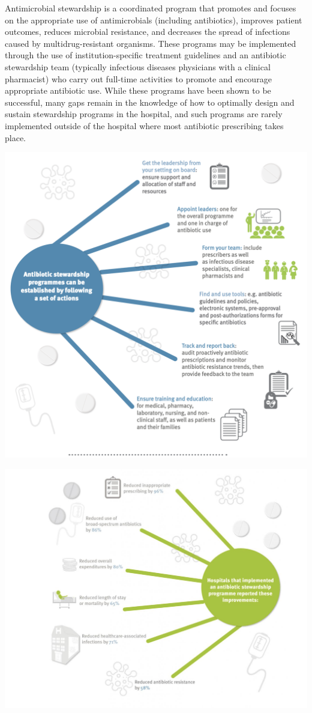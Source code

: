 \documentclass[]{tufte-handout}
\begin{document}
Antimicrobial stewardship is a coordinated program that promotes and
focuses on the appropriate use of antimicrobials (including
antibiotics), improves patient outcomes, reduces microbial resistance,
and decreases the spread of infections caused by multidrug-resistant
organisms. These programs may be implemented through the use of
institution-specific treatment guidelines and an antibiotic stewardship
team (typically infectious diseases physicians with a clinical
pharmacist) who carry out full-time activities to promote and encourage
appropriate antibiotic use. While these programs have been shown to be
successful, many gaps remain in the knowledge of how to optimally design
and sustain stewardship programs in the hospital, and such programs are
rarely implemented outside of the hospital where most antibiotic
prescribing takes place.

\includegraphics{images/stewardship actions.png}

\includegraphics{images/stewardship_impl.png}
\end{document}
